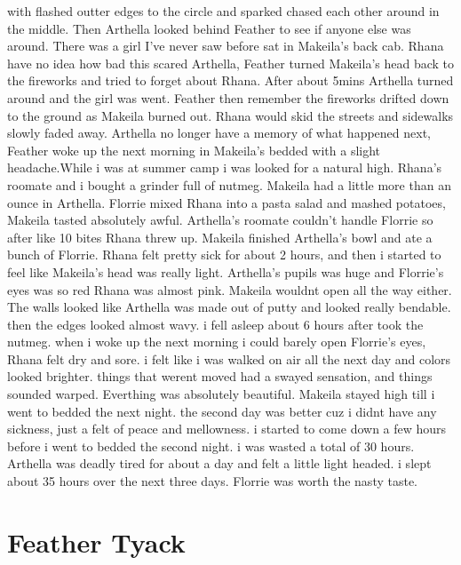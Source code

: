 \documentclass[12pt]{book}
\begin{document}
with flashed outter edges to the circle and sparked chased each other around in the middle. Then Arthella looked behind Feather to see if anyone else was around. There was a girl I've never saw before sat in Makeila's back cab. Rhana have no idea how bad this scared Arthella, Feather turned Makeila's head back to the fireworks and tried to forget about Rhana. After about 5mins Arthella turned around and the girl was went. Feather then remember the fireworks drifted down to the ground as Makeila burned out. Rhana would skid the streets and sidewalks slowly faded away. Arthella no longer have a memory of what happened next, Feather woke up the next morning in Makeila's bedded with a slight headache.While i was at summer camp i was looked for a natural high. Rhana's roomate and i bought a grinder full of nutmeg. Makeila had a little more than an ounce in Arthella. Florrie mixed Rhana into a pasta salad and mashed potatoes, Makeila tasted absolutely awful. Arthella's roomate couldn't handle Florrie so after like 10 bites Rhana threw up. Makeila finished Arthella's bowl and ate a bunch of Florrie. Rhana felt pretty sick for about 2 hours, and then i started to feel like Makeila's head was really light. Arthella's pupils was huge and Florrie's eyes was so red Rhana was almost pink. Makeila wouldnt open all the way either. The walls looked like Arthella was made out of putty and looked really bendable. then the edges looked almost wavy. i fell asleep about 6 hours after took the nutmeg. when i woke up the next morning i could barely open Florrie's eyes, Rhana felt dry and sore. i felt like i was walked on air all the next day and colors looked brighter. things that werent moved had a swayed sensation, and things sounded warped. Everthing was absolutely beautiful. Makeila stayed high till i went to bedded the next night. the second day was better cuz i didnt have any sickness, just a felt of peace and mellowness. i started to come down a few hours before i went to bedded the second night. i was wasted a total of 30 hours. Arthella was deadly tired for about a day and felt a little light headed. i slept about 35 hours over the next three days. Florrie was worth the nasty taste.



\chapter{Feather Tyack}
\end{document}
